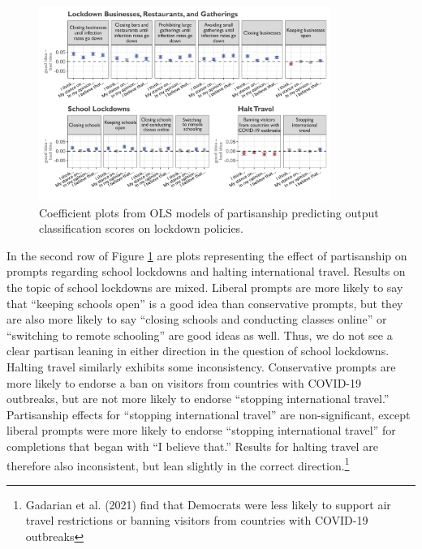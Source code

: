 \documentclass{article} %
\begin{document}
\begin{figure}[!htbp]
  \captionsetup{justification=raggedright,singlelinecheck=false}
  \caption{Coefficient plots from OLS models of partisanship predicting output classification scores on lockdown policies.}
  \label{fig:partisan3}
  \centering
\includegraphics[width=0.85\textwidth]{./figures/media/image14.png}
\end{figure}

In the second row of Figure \ref{fig:partisan3} are plots representing the effect of
partisanship on prompts regarding school lockdowns and halting
international travel. Results on the topic of school lockdowns are
mixed. Liberal prompts are more likely to say that ``keeping schools
open'' is a good idea than conservative prompts, but they are also more
likely to say ``closing schools and conducting classes online'' or
``switching to remote schooling'' are good ideas as well. Thus, we do
not see a clear partisan leaning in either direction in the question of
school lockdowns. Halting travel similarly exhibits some inconsistency.
Conservative prompts are more likely to endorse a ban on visitors from
countries with COVID-19 outbreaks, but are not more likely to endorse
``stopping international travel.'' Partisanship effects for ``stopping
international travel'' are non-significant, except liberal prompts were
more likely to endorse ``stopping international travel'' for completions
that began with ``I believe that.'' Results for halting travel are
therefore also inconsistent, but lean slightly in the correct
direction.\footnote{Gadarian et al. (2021) find that Democrats were less
  likely to support air travel restrictions or banning visitors from
  countries with COVID-19 outbreaks}
\end{document}
